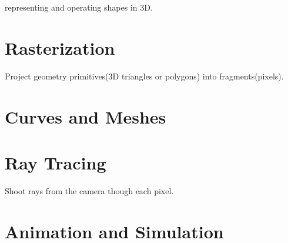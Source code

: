 \documentclass[UTF8]{book}
\begin{document}
representing and operating shapes in 3D.



\section{Rasterization}
Project geometry primitives(3D triangles or polygons) into fragments(pixels).



\section{Curves and Meshes}


\section{Ray Tracing}
Shoot rays from the camera though each pixel.

\section{Animation and Simulation}
\end{document}
